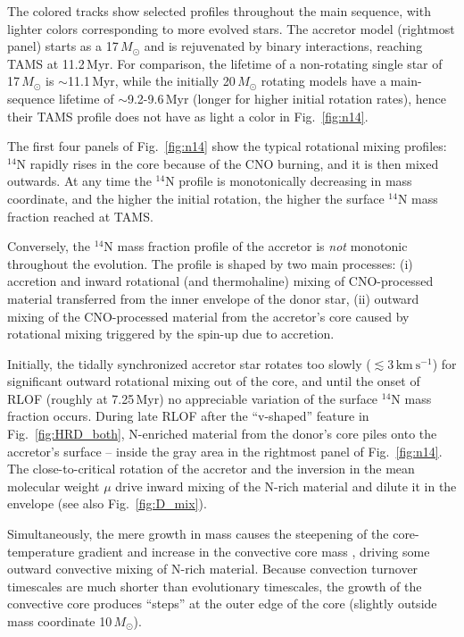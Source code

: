 \documentclass[twocolumn,twocolappendix,trackchanges]{aastex63}
\newcommand{\kms}{{\mathrm{km\ s^{-1}}}}
\DeclareRobustCommand{\Figref}[1]{Fig.~\ref{#1}}
\begin{document}
The colored tracks show selected profiles throughout the main
sequence, with lighter colors corresponding to more evolved stars. The
accretor model (rightmost panel) starts as a 17$\,M_\odot$ and is
rejuvenated by binary interactions, reaching TAMS at
11.2\,Myr. For comparison, the lifetime of a non-rotating single star
of 17\,$M_\odot$ is $\sim$11.1\,Myr, while the initially 20\,$M_\odot$
rotating models have a main-sequence lifetime of $\sim$9.2-9.6\,Myr (longer
for higher initial rotation rates), hence their TAMS profile does not
have as light a color in \Figref{fig:n14}.

The first four panels of \Figref{fig:n14} show the typical rotational
mixing profiles: $^{14}\mathrm{N}$ rapidly rises in the core because
of the CNO burning, and it is then mixed outwards. At any time
the $^{14}\mathrm{N}$ profile is monotonically decreasing in mass
coordinate, and the higher the initial rotation, the higher the
surface $^{14}\mathrm{N}$ mass fraction reached at TAMS.

Conversely, the $^{14}\mathrm{N}$ mass fraction profile of the
accretor is \emph{not} monotonic throughout the evolution.  The
profile is shaped by two main processes: (i) accretion and inward
rotational (and thermohaline) mixing of CNO-processed material
transferred from the inner envelope of the donor star, (ii) outward
mixing of the CNO-processed material from the accretor's core caused
by rotational mixing triggered by the spin-up due to accretion.

Initially, the tidally synchronized accretor star
rotates too slowly ($\lesssim 3\,\kms$) for significant outward rotational mixing out of
the core, and until the onset of RLOF (roughly at 7.25\,Myr) no appreciable variation of the
surface $^{14}\mathrm{N}$ mass fraction occurs. During late RLOF after the
``v-shaped'' feature in \Figref{fig:HRD_both}, N-enriched material from the
donor's core piles onto the accretor's surface -- inside the gray area in
the rightmost panel of \Figref{fig:n14}. The close-to-critical
rotation of the accretor and the inversion in the mean molecular
weight $\mu$ drive inward mixing of
the N-rich material and dilute it in the envelope (see also \Figref{fig:D_mix}).

Simultaneously, the mere growth in mass causes the steepening of the
core-temperature gradient and increase in the convective core mass
\citep[rejuvenation, e.g.,][]{schneider:16}, driving some outward convective mixing
of N-rich material. Because convection turnover timescales are much
shorter than evolutionary timescales, the growth of the convective
core produces ``steps'' at the outer edge of the core (slightly
outside mass coordinate 10\,$M_\odot$).
\end{document}
